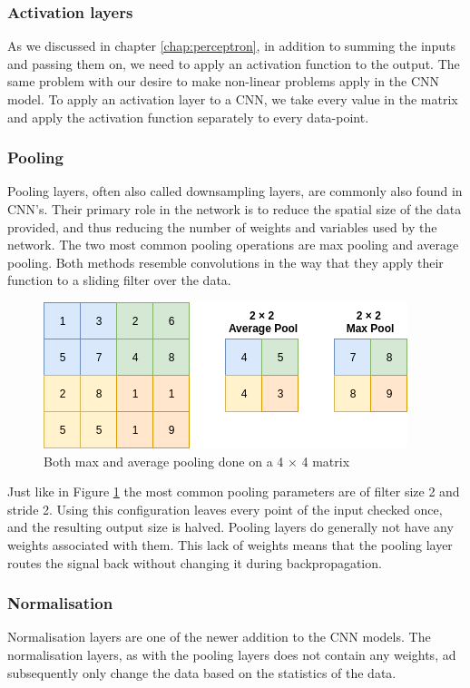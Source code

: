 \subsubsection{Activation layers}
As we discussed in chapter \ref{chap:perceptron}, in addition to summing the inputs and passing them on, we need to apply an activation function to the output. The same problem with our desire to make non-linear problems apply in the CNN model. 
To apply an activation layer to a CNN, we take every value in the matrix and apply the activation function separately to every data-point. 

\subsubsection{Pooling}
Pooling layers, often also called downsampling layers, are commonly also found in CNN's. 
Their primary role in the network is to reduce the spatial size of the data provided, and thus reducing the number of weights and variables used by the network.  
The two most common pooling operations are max pooling and average pooling. Both methods resemble convolutions in the way that they apply their function to a sliding filter over the data. 
 
\begin{figure}[h]
        \centering
        \includegraphics[scale=0.7]{background/figures/pooling.png}
        \caption{Both max and average pooling done on a 4 $\times$ 4 matrix}
        \label{fig:pooling}
\end{figure}

Just like in Figure \ref{fig:pooling} the most common pooling parameters are of filter size 2 and stride 2. Using this configuration leaves every point of the input checked once, and the resulting output size is halved. 
Pooling layers do generally not have any weights associated with them. This lack of weights means that the pooling layer routes the signal back without changing it during backpropagation.

\subsubsection{Normalisation}
Normalisation layers are one of the newer addition to the CNN models. The normalisation layers, as with the pooling layers does not contain any weights, ad subsequently only change the data based on the statistics of the data. 



